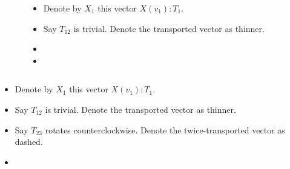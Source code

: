 \begin{frame}
\begin{columns}
\begin{column}{0.65\textwidth}
\vspace{12pt}
\begingroup
{}

\endgroup
\end{column}
\begin{column}{0.35\textwidth}
\begin{itemize}
\item<1-> Denote by \( X_1 \) this vector \( X(v_1):T_1 \).
\item<1-> Say \( T_{12} \) is trivial. Denote the transported vector as thinner.
\item<1-> 
\item<1-> 
\end{itemize}
\end{column}
\end{columns}
\end{frame}

\begin{frame}
\begin{columns}
\begin{column}{0.65\textwidth}
\vspace{12pt}
\begingroup
{}

\endgroup
\end{column}
\begin{column}{0.35\textwidth}
\begin{itemize}
\item<1-> Denote by \( X_1 \) this vector \( X(v_1):T_1 \).
\item<1-> Say \( T_{12} \) is trivial. Denote the transported vector as thinner.
\item<1-> Say \( T_{23} \) rotates counterclockwise. Denote the twice-transported vector as dashed.
\item<1-> 
\end{itemize}
\end{column}
\end{columns}
\end{frame}

